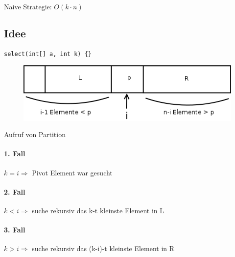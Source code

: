 Naive Strategie: $O(k \cdot n)$


\subsection*{Idee} 

\begin{lstlisting}
select(int[] a, int k) {}
\end{lstlisting}

\begin{figure}
\vspace{-25pt}
\includegraphics[width=\linewidth]{6/Grafik/img5.png}
\caption{}
\end{figure}

\vspace{30pt}
Aufruf von Partition
\vspace{90pt}

\paragraph{1. Fall} $k=i \Rightarrow$ Pivot Element war gesucht
\paragraph{2. Fall} $k<i \Rightarrow$ suche rekursiv das k-t kleinste Element in L 
\paragraph{3. Fall} $k>i \Rightarrow$ suche rekursiv das (k-i)-t kleinste Element in R
